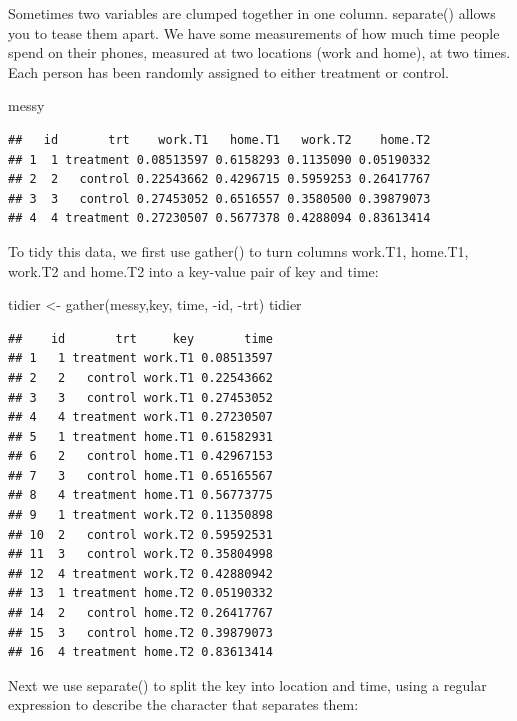 \documentclass[
]{book}
\newenvironment{Shaded}{\begin{snugshade}}{\end{snugshade}}
\newcommand{\FunctionTok}[1]{\textcolor[rgb]{0.00,0.00,0.00}{#1}}
\newcommand{\NormalTok}[1]{#1}
\newcommand{\OtherTok}[1]{\textcolor[rgb]{0.56,0.35,0.01}{#1}}
\newcommand{\SpecialCharTok}[1]{\textcolor[rgb]{0.00,0.00,0.00}{#1}}
\begin{document}
Sometimes two variables are clumped together in one column. separate() allows you to tease them apart. We have some measurements of how much time people spend on their phones, measured at two locations (work and home), at two times. Each person has been randomly assigned to either treatment or control.

\begin{Shaded}
\begin{Highlighting}[]
\NormalTok{messy}
\end{Highlighting}
\end{Shaded}

\begin{verbatim}
##   id       trt    work.T1   home.T1   work.T2    home.T2
## 1  1 treatment 0.08513597 0.6158293 0.1135090 0.05190332
## 2  2   control 0.22543662 0.4296715 0.5959253 0.26417767
## 3  3   control 0.27453052 0.6516557 0.3580500 0.39879073
## 4  4 treatment 0.27230507 0.5677378 0.4288094 0.83613414
\end{verbatim}

To tidy this data, we first use gather() to turn columns work.T1, home.T1, work.T2 and home.T2 into a key-value pair of key and time:

\begin{Shaded}
\begin{Highlighting}[]
\NormalTok{tidier }\OtherTok{\textless{}{-}}  \FunctionTok{gather}\NormalTok{(messy,key, time, }\SpecialCharTok{{-}}\NormalTok{id, }\SpecialCharTok{{-}}\NormalTok{trt)}
\NormalTok{tidier}
\end{Highlighting}
\end{Shaded}

\begin{verbatim}
##    id       trt     key       time
## 1   1 treatment work.T1 0.08513597
## 2   2   control work.T1 0.22543662
## 3   3   control work.T1 0.27453052
## 4   4 treatment work.T1 0.27230507
## 5   1 treatment home.T1 0.61582931
## 6   2   control home.T1 0.42967153
## 7   3   control home.T1 0.65165567
## 8   4 treatment home.T1 0.56773775
## 9   1 treatment work.T2 0.11350898
## 10  2   control work.T2 0.59592531
## 11  3   control work.T2 0.35804998
## 12  4 treatment work.T2 0.42880942
## 13  1 treatment home.T2 0.05190332
## 14  2   control home.T2 0.26417767
## 15  3   control home.T2 0.39879073
## 16  4 treatment home.T2 0.83613414
\end{verbatim}

Next we use separate() to split the key into location and time, using a regular expression to describe the character that separates them:
\end{document}
